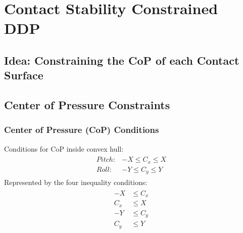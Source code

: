 
\chapter{Contact Stability Constrained DDP}\label{c3}
\section{Idea: Constraining the CoP of each Contact Surface}

\section{Center of Pressure Constraints}
\subsection{Center of Pressure (CoP) Conditions}
Conditions for \gls{CoP} inside convex hull:
\begin{align}
\begin{split}
Pitch:& -X \leq C_x \leq X \\
Roll:& -Y \leq C_y \leq Y
\end{split}
\end{align}
Represented by the four inequality conditions:
\begin{align}
\begin{split}
-X &\leq C_x \\
C_x &\leq X \\
-Y &\leq C_y \\
C_y &\leq Y \\
\end{split}
\end{align}

